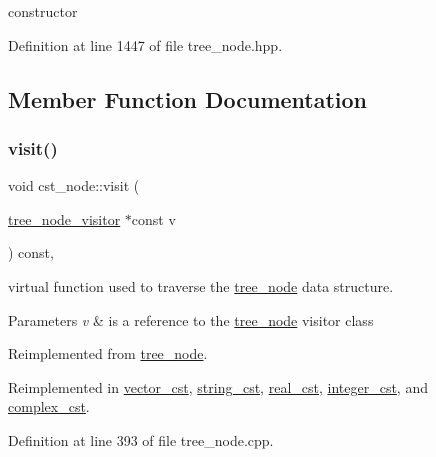 constructor 



Definition at line 1447 of file tree\+\_\+node.\+hpp.



\subsection{Member Function Documentation}
\mbox{\label{structcst__node_a64e2bc20ffda1b13ffe894cacb982f89}} 
\subsubsection{\texorpdfstring{visit()}{visit()}}
{\footnotesize\ttfamily void cst\+\_\+node\+::visit (\begin{DoxyParamCaption}\item[{\hyperlink{classtree__node__visitor}{tree\+\_\+node\+\_\+visitor} $\ast$const}]{v }\end{DoxyParamCaption}) const\hspace{0.3cm}{\ttfamily [override]}, {\ttfamily [virtual]}}



virtual function used to traverse the \hyperlink{classtree__node}{tree\+\_\+node} data structure. 


\begin{DoxyParams}{Parameters}
{\em v} & is a reference to the \hyperlink{classtree__node}{tree\+\_\+node} visitor class \\
\hline
\end{DoxyParams}


Reimplemented from \hyperlink{classtree__node_aa9abba3f1b30e0be80b4a56b188c6ecc}{tree\+\_\+node}.



Reimplemented in \hyperlink{structvector__cst_a6efa88e172cac566dcfb5fd0a04ff947}{vector\+\_\+cst}, \hyperlink{structstring__cst_a45a7b808005d8535d6cdf939d6ac2fa5}{string\+\_\+cst}, \hyperlink{structreal__cst_ae6808fef9486f7f044fde5befedf425a}{real\+\_\+cst}, \hyperlink{structinteger__cst_a9cf8f2538b55564a1064ed928fdd5dc1}{integer\+\_\+cst}, and \hyperlink{structcomplex__cst_aa98d0db16f586dd9ca9b16a468b67d2e}{complex\+\_\+cst}.



Definition at line 393 of file tree\+\_\+node.\+cpp.



